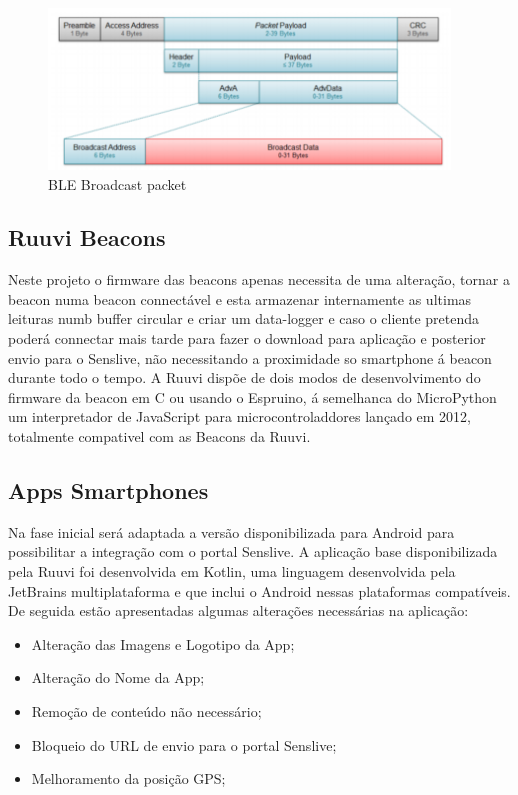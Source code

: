 \begin{figure}[ht]
  \centering
  \includegraphics[width=0.95\textwidth]{images/blepacket.png}
  \caption{BLE Broadcast packet\cite{blepacket}}\label{blepacket}
\end{figure}


\subsection{Ruuvi Beacons}
\par Neste projeto o firmware das beacons apenas necessita de uma alteração, tornar a beacon numa beacon  connectável e esta armazenar internamente as ultimas leituras numb buffer circular e criar um data-logger e caso o cliente pretenda poderá connectar mais tarde para fazer o download para aplicação e posterior envio para o Senslive, não necessitando a proximidade so smartphone á beacon durante todo o tempo. A Ruuvi dispõe de dois modos de desenvolvimento do firmware da beacon em C ou usando o Espruino, á semelhanca do MicroPython um interpretador de JavaScript para microcontroladdores lançado em 2012, totalmente compativel com as Beacons da Ruuvi.
\subsection{Apps Smartphones}
Na fase inicial será adaptada a versão disponibilizada para Android para possibilitar a integração com o portal Senslive. A aplicação base disponibilizada pela Ruuvi foi desenvolvida em Kotlin\cite{ruuviappgithub}, uma linguagem desenvolvida pela JetBrains multiplataforma e que inclui o Android nessas plataformas compatíveis.
 De seguida estão apresentadas algumas alterações necessárias na aplicação:
\begin{itemize}
\item Alteração das Imagens e Logotipo da App;
\item Alteração do Nome da App;
\item Remoção de conteúdo não necessário;
\item Bloqueio do URL de envio para o portal Senslive;
\item Melhoramento da posição GPS;
\end{itemize}


